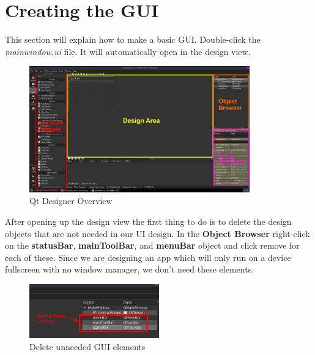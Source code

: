 \documentclass{article}
\begin{document}
\section{Creating the GUI}

This section will explain how to make a basic GUI. Double-click the \textit{mainwindow.ui} file. It will automatically open in the design view.

	\begin{figure}[H]
		\centering
		\includegraphics[width=0.85\textwidth]{pics/Qt_Designer.png}
		\caption{Qt Designer Overview}
		\label{Qt_Designer}
	\end{figure}

After opening up the design view the first thing to do is to delete the design objects that are not needed in our UI design. In the \textbf{Object Browser} right-click on the \textbf{statusBar}, \textbf{mainToolBar}, and \textbf{menuBar} object and click remove for each of these. Since we are designing an app which will only run on a device fullscreen with no window manager, we don't need these elements. 

	\begin{figure}[H]
		\centering
		\includegraphics[width=0.5\textwidth]{pics/Delete_Window_Dressings.png}
		\caption{Delete unneeded GUI elements}
		\label{Delete_Window_Dressings}
	\end{figure}
\end{document}
